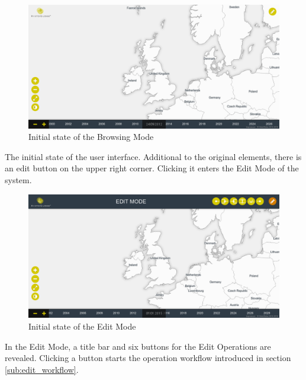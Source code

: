\newpage
\begin{minipage}[t]{0.47\textwidth}

  \begin{figure}[H]
    \centering
    \includegraphics[width=1.0\textwidth]{graphics/development/user_interface_design_process/1_init.png}
    \caption{Initial state of the Browsing Mode}
    \label{fig:final_1_init}
  \end{figure}

  The initial state of the user interface. Additional to the original elements, there is an edit button on the upper right corner. Clicking it enters the Edit Mode of the system.

\end{minipage}    %
\hspace{1.5em}    %
\begin{minipage}[t]{0.47\textwidth}

  \begin{figure}[H]
    \centering
    \includegraphics[width=1.0\textwidth]{graphics/development/user_interface_design_process/2_edit_mode.png}
    \caption{Initial state of the Edit Mode}
    \label{fig:final_2_edit_mode}
  \end{figure}

  In the Edit Mode, a title bar and six buttons for the Edit Operations are   revealed. Clicking a button starts the operation workflow introduced in section \ref{sub:edit_workflow}.

\end{minipage}

